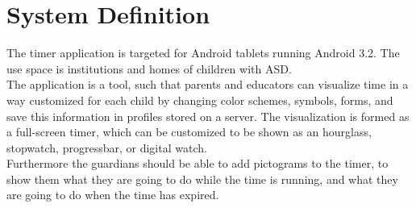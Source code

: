 \section{System Definition}
\label{sec:sys_def}
The timer application is targeted for Android tablets running Android 3.2. The use space is institutions and homes of children with ASD.\\
   The application is a tool, such that parents and educators can visualize time in a way customized for each child by changing color schemes, symbols, forms, and save this information in profiles stored on a server. The visualization is formed as a full-screen timer, which can be customized to be shown as an hourglass, stopwatch, progressbar, or digital watch.\\
   Furthermore the guardians should be able to add pictograms to the timer, to show them what they are going to do while the time is running, and what they are going to do when the time has expired.
   
\begin{comment}   
  In addition, the timer application should be used to control the allowed time spent on other applications, such as games. When the launcher is in autist mode, the timer application should be opened as an overlay whenever another application is opened. This overlay shows how much time is left, and when the time is up, it will lock the given application with a customized cooldown. Also the timer application should include a timelock, such that other applications are only available in specific time spans.
\end{comment}